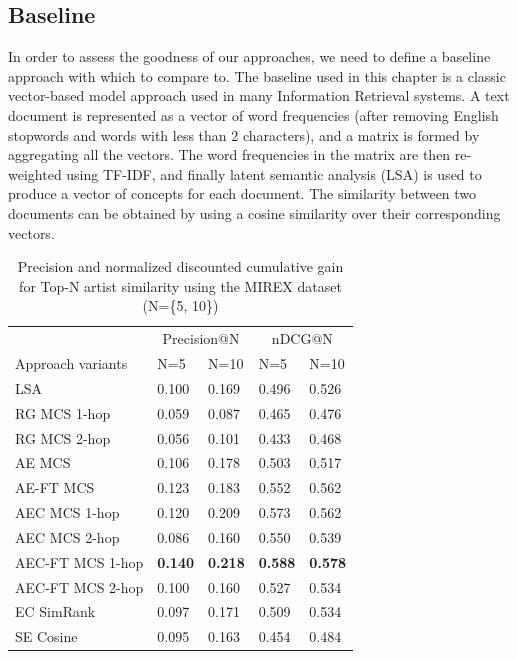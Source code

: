 \subsection{Baseline} %
In order to assess the goodness of our approaches, we need to define a baseline approach with which to compare to. The baseline used in this chapter is a classic vector-based model approach used in many Information Retrieval systems. A text document is represented as a vector of word frequencies (after removing English stopwords and words with less than 2 characters), and a matrix is formed by aggregating all the vectors. The word frequencies in the matrix are then re-weighted using TF-IDF, and finally latent semantic analysis (LSA) \cite{Deerwesteretal1990} is used to produce a vector of concepts for each document. The similarity between two documents can be obtained by using a cosine similarity over their corresponding vectors.

\begin{table}[ht!]
\small
\centering
	\begin{tabular}{  lllll }
 	\toprule
& \multicolumn{2}{c}{Precision@N} & \multicolumn{2}{c}{nDCG@N} \\
\cmidrule(lr){2-3}
\cmidrule(lr){4-5}
	Approach variants & N=5 & N=10 & N=5 & N=10 \\
	\midrule
LSA & 0.100 & 0.169 & 0.496 & 0.526 \\
RG MCS 1-hop & 0.059 & 0.087 & 0.465 & 0.476 \\
RG MCS 2-hop & 0.056 & 0.101 & 0.433 & 0.468 \\
AE MCS & 0.106 & 0.178 & 0.503  & 0.517 \\
AE-FT MCS & 0.123 & 0.183 & 0.552 & 0.562 \\
AEC MCS 1-hop & 0.120 & 0.209 & 0.573 & 0.562 \\
AEC MCS 2-hop & 0.086 & 0.160 & 0.550 & 0.539 \\
AEC-FT MCS 1-hop & \textbf{0.140} & \textbf{0.218} & \textbf{0.588} & \textbf{0.578} \\
AEC-FT MCS 2-hop & 0.100 & 0.160 & 0.527 & 0.534 \\
EC SimRank & 0.097& 0.171 &  0.509 & 0.534 \\
SE Cosine & 0.095 & 0.163 & 0.454 & 0.484 \\
\bottomrule	
	\end{tabular}
	\caption{Precision and normalized discounted cumulative gain for Top-N artist similarity using the MIREX dataset (N=\{5, 10\})}	
	\label{tbl:similarity:res_mirex}
\end{table}

